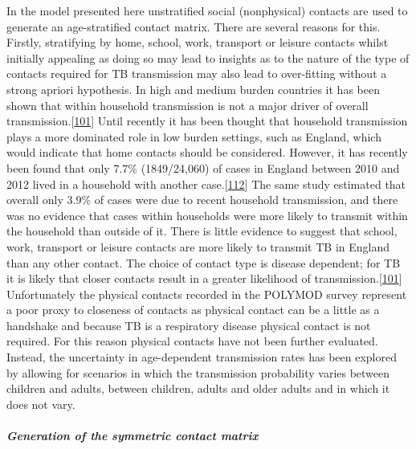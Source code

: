 \documentclass[11pt,twoside]{bristolthesis}
\begin{document}
  In the model presented here unstratified social (nonphysical) contacts are used to generate an age-stratified contact matrix. There are several reasons for this. Firstly, stratifying by home, school, work, transport or leisure contacts whilst initially appealing as doing so may lead to insights as to the nature of the type of contacts required for TB transmission may also lead to over-fitting without a strong apriori hypothesis. In high and medium burden countries it has been shown that within household transmission is not a major driver of overall transmission.{[}\protect\hyperlink{ref-Mathema2018}{101}{]} Until recently it has been thought that household transmission plays a more dominated role in low burden settings, such as England, which would indicate that home contacts should be considered. However, it has recently been found that only 7.7\% (1849/24,060) of cases in England between 2010 and 2012 lived in a household with another case.{[}\protect\hyperlink{ref-Lalor2017}{112}{]} The same study estimated that overall only 3.9\% of cases were due to recent household transmission, and there was no evidence that cases within households were more likely to transmit within the household than outside of it. There is little evidence to suggest that school, work, transport or leisure contacts are more likely to transmit TB in England than any other contact. The choice of contact type is disease dependent; for TB it is likely that closer contacts result in a greater likelihood of transmission.{[}\protect\hyperlink{ref-Mathema2018}{101}{]} Unfortunately the physical contacts recorded in the POLYMOD survey represent a poor proxy to closeness of contacts as physical contact can be a little as a handshake and because TB is a respiratory disease physical contact is not required. For this reason physical contacts have not been further evaluated. Instead, the uncertainty in age-dependent transmission rates has been explored by allowing for scenarios in which the transmission probability varies between children and adults, between children, adults and older adults and in which it does not vary.
  
  \hypertarget{generation-of-the-symmetric-contact-matrix}{%
  \subparagraph{Generation of the symmetric contact matrix}\label{generation-of-the-symmetric-contact-matrix}}
  
\end{document}
